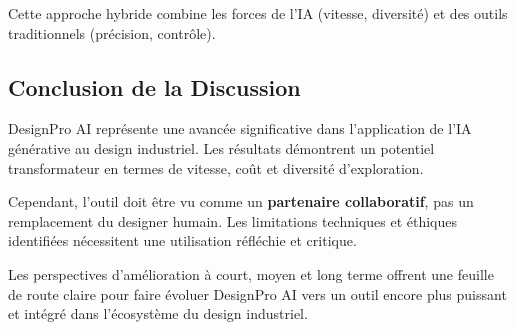 Cette approche hybride combine les forces de l'IA (vitesse, diversité) et des outils traditionnels (précision, contrôle).

\subsection{Conclusion de la Discussion}

DesignPro AI représente une avancée significative dans l'application de l'IA générative au design industriel. Les résultats démontrent un potentiel transformateur en termes de vitesse, coût et diversité d'exploration.

Cependant, l'outil doit être vu comme un \textbf{partenaire collaboratif}, pas un remplacement du designer humain. Les limitations techniques et éthiques identifiées nécessitent une utilisation réfléchie et critique.

Les perspectives d'amélioration à court, moyen et long terme offrent une feuille de route claire pour faire évoluer DesignPro AI vers un outil encore plus puissant et intégré dans l'écosystème du design industriel.
